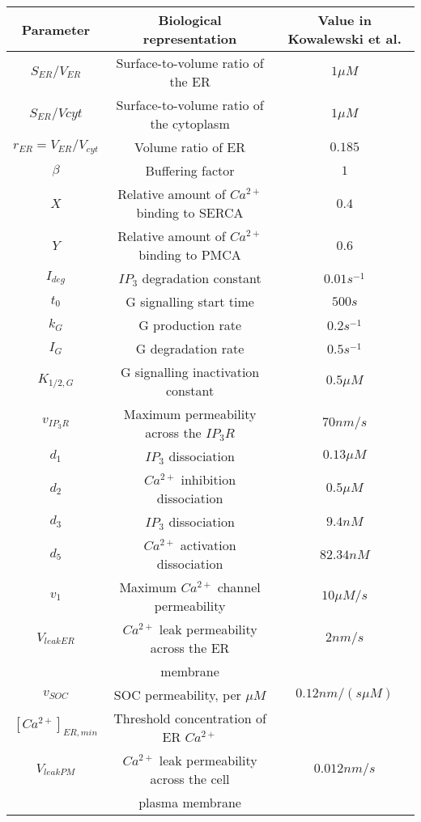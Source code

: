\begin{table}[h!!!t!!!b!!!p]
\begin{center}
\begin{tabular}{ c c c }
Parameter & Biological representation & Value in Kowalewski et al.\\
\hline
$S_{ER}/V_{ER}$ & Surface-to-volume ratio of the ER & $1\mu M$\\
\hline
$S_{ER}/V{cyt}$ & Surface-to-volume ratio of the cytoplasm & $1 \mu M$\\
\hline
$r_{ER}=V_{ER}/V_{cyt}$ & Volume ratio of ER & $0.185$\\
\hline
$\beta$ & Buffering factor & $1$\\
\hline
$X$ & Relative amount of $Ca^{2+}$ binding to SERCA & $0.4$\\
\hline
$Y$ & Relative amount of $Ca^{2+}$ binding to PMCA & $0.6$\\
\hline
$I_{deg}$ & $IP_3$ degradation constant & $0.01 s^{-1}$\\
\hline
$t_0$ & G signalling start time & $500s$\\
\hline
$k_G$ & G production rate & $0.2s^{-1}$\\
\hline
$I_G$ & G degradation rate & $0.5 s^{-1}$\\
\hline
$K_{1/2,G}$ & G signalling inactivation constant & $0.5 \mu M$\\
\hline
$v_{IP_3R}$ & Maximum permeability across the $IP_3R$ & $70 nm/s$\\
\hline
$d_1$ & $IP_3$ dissociation & $0.13 \mu M$\\
\hline
$d_2$ & $Ca^{2+}$ inhibition dissociation & $0.5 \mu M$\\
\hline
$d_3$ & $IP_3$ dissociation & $9.4 nM$\\
\hline
$d_5$ & $Ca^{2+}$ activation dissociation & $82.34 nM$\\
\hline
$v_1$ & Maximum $Ca^{2+}$ channel permeability & $10 \mu M/s$\\
\hline
$V_{leak ER}$ & $Ca^{2+}$ leak permeability across the ER & $2 nm/s$\\
& membrane &\\
\hline
$v_{SOC}$ & SOC permeability, per $\mu M$ & $0.12 nm/(s\mu M)$\\
\hline
$[Ca^{2+}]_{ER,min}$ & Threshold concentration of ER $Ca^{2+}$ & \\
\hline
$V_{leak PM}$ & $Ca^{2+}$ leak permeability across the cell & $0.012 nm/s$\\
&  plasma membrane & \\

\end{tabular}
\end{center}
\end{table}
